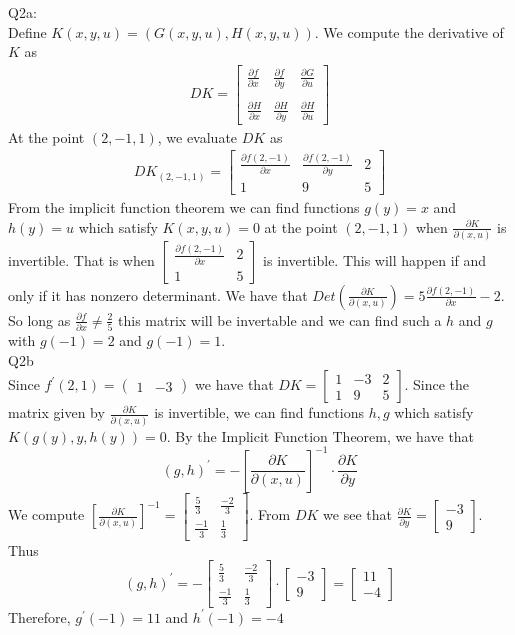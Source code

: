 \documentclass[letterpaper]{article}
\begin{document}
Q2a: \\Define $K(x,y,u) = (G(x,y,u),H(x,y,u))$. We compute the derivative of $K$ as 
\begin{align*} DK = \begin{bmatrix} \frac{\partial f}{\partial x} & \frac{\partial f}{\partial y} & \frac{\partial G}{\partial u} \\ \\  \frac{\partial H}{\partial x} & \frac{\partial H}{\partial y} & \frac{\partial H}{\partial u}\end{bmatrix} \end{align*}
At the point $(2,-1,1)$, we evaluate $DK$ as \begin{align*} DK_{(2,-1,1)} = \begin{bmatrix} \frac{\partial f(2,-1)}{\partial x} & \frac{\partial f(2,-1)}{\partial y} & 2\\ 1& 9& 5\end{bmatrix} \end{align*}
From the implicit function theorem we can find functions $g(y)=x$ and $h(y)=u$ which satisfy $K(x,y,u)=0$ at the point $(2,-1,1)$ when $\frac{\partial K}{\partial (x,u)}$ is invertible. That is when $\begin{bmatrix} \frac{\partial f(2,-1)}{\partial x} & 2 \\ 1 & 5\end{bmatrix}$ is invertible. This will happen if and only if it has nonzero determinant.
We have that $Det(\frac{\partial K}{\partial (x,u)}) = 5 \frac{\partial f(2,-1)}{\partial x}-2$. So long as $\frac{\partial f}{\partial x} \neq \frac{2}{5}$ this matrix will be invertable and we can find such a $h$ and $g$ with $g(-1)=2$ and $g(-1)=1$. 
\\ Q2b \\ 
Since $f^\prime (2,1) =\begin{pmatrix}1&-3\end{pmatrix} $ we have that $DK = \begin{bmatrix} 1 & -3 & 2 \\ 1 & 9 & 5\end{bmatrix}$. Since the matrix given by $\frac{\partial K}{\partial (x,u)}$ is invertible, we can find functions $h,g$ which satisfy $K(g(y),y,h(y))=0$. By the Implicit Function Theorem, we have that $$(g,h)^\prime = - \left[ \frac{\partial K}{\partial (x,u)} \right] ^{-1} \cdot \frac{\partial K}{\partial y}$$ We compute $ \left[ \frac{\partial K}{\partial (x,u)} \right] ^{-1} = \begin{bmatrix} \frac{5}{3} & \frac{-2}{3} \\ \frac{-1}{3} & \frac{1}{3}\end{bmatrix}$. From $DK$ we see that $\frac{\partial K}{\partial y} = \begin{bmatrix} -3 \\ 9\end{bmatrix}$. 
\\ Thus $$(g,h)^\prime = - \begin{bmatrix} \frac{5}{3} & \frac{-2}{3} \\ \frac{-1}{3} & \frac{1}{3}\end{bmatrix} \cdot \begin{bmatrix} -3 \\ 9\end{bmatrix} = \begin{bmatrix} 11 \\ -4\end{bmatrix}$$
Therefore, $g^\prime (-1) = 11$ and $h^\prime(-1) = -4$
\end{document}
